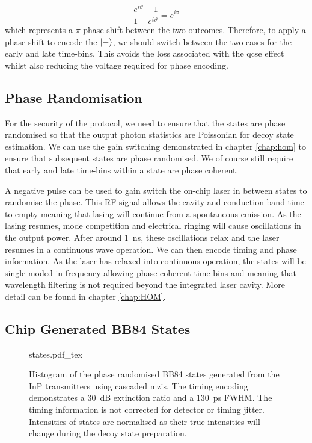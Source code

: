 \begin{equation}
	\frac{e^{i\vartheta} -1}{1 - e^{i\vartheta}} = e^{i\pi}
\end{equation}
which represents a $\pi$ phase shift between the two outcomes. Therefore, to apply a phase shift to encode the $\ket{-}$, we should switch between the two cases for the early and late time-bins. This avoids the loss associated with the \ac{qcse} effect whilst also reducing the voltage required for phase encoding.


\subsection{Phase Randomisation}

For the security of the protocol, we need to ensure that the states are phase randomised so that the output photon statistics are Poissonian for decoy state estimation. We can use the gain switching demonstrated in chapter \ref{chap:hom} to ensure that subsequent states are phase randomised. We of course still require that early and late time-bins within a state are phase coherent. 

A negative pulse can be used to gain switch the on-chip laser in between states to randomise the phase. This RF signal allows the cavity and conduction band time to empty meaning that lasing will continue from a spontaneous emission. As the lasing resumes, mode competition and electrical ringing will cause oscillations in the output power. After around \SI{1}{ns}, these oscillations relax and the laser resumes in a continuous wave operation. We can then encode timing and phase information. As the laser has relaxed into continuous operation, the states will be single moded in frequency allowing phase coherent time-bins and meaning that wavelength filtering is not required beyond the integrated laser cavity. More detail can be found in chapter \ref{chap:HOM}.

\subsection{Chip Generated BB84 States}

\begin{figure}[tbp]
	\centering
	\small
	\def\svgwidth{\textwidth} 
	{states.pdf_tex}
	\caption[Phase randomised BB84 states generated from the InP transmitters]{Histogram of the phase randomised BB84 states generated from the \ac{InP} transmitters using cascaded \acp{mzi}. The timing encoding demonstrates a \SI{30}{dB} extinction ratio and a \SI{130}{\ps} \ac{FWHM}. The timing information is not corrected for detector or timing jitter. Intensities of states are normalised as their true intensities will change during the decoy state preparation.}
	\label{fig:states}
\end{figure}

